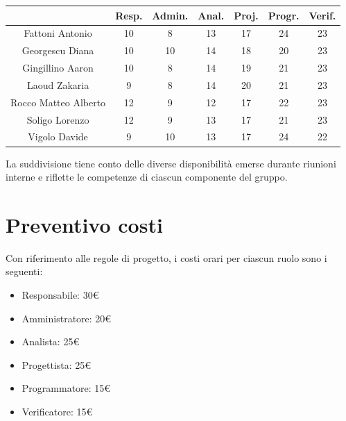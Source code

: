 \documentclass[a4paper,12pt]{article}
\begin{document}
\vspace{1cm}
\begin{table}[H]
{
\centering
\begin{tabular}{c|c|c|c|c|c|c}

        & \textbf{Resp.} & \textbf{Admin.} & \textbf{Anal.} & \textbf{Proj.} & \textbf{Progr.} & \textbf{Verif.} \\
        \hline
        Fattoni Antonio & 10 & 8 & 13 & 17 & 24 & 23\\
        \hline
        Georgescu Diana & 10 & 10 & 14 & 18 & 20 & 23\\
        \hline
        Gingillino Aaron & 10 & 8 & 14 & 19 & 21 & 23\\
        \hline
        Laoud Zakaria & 9 & 8 & 14 & 20 & 21 & 23\\
        \hline
        Rocco Matteo Alberto & 12 & 9 & 12 & 17 & 22 & 23\\
        \hline
        Soligo Lorenzo & 12 & 9 & 13 & 17 & 21 & 23\\
        \hline
        Vigolo Davide & 9 & 10 & 13 & 17 & 24 & 22\\
\end{tabular}\par
}
\end{table}

\noindent La suddivisione tiene conto delle diverse disponibilità emerse durante riunioni interne e riflette le competenze di ciascun componente del gruppo.

\section{Preventivo costi}
Con riferimento alle regole di progetto, i costi orari per ciascun ruolo sono i seguenti:
\begin{itemize} [noitemsep]
    \item Responsabile: 30€
    \item Amministratore: 20€
    \item Analista: 25€
    \item Progettista: 25€
    \item Programmatore: 15€
    \item Verificatore: 15€
\end{itemize}
\end{document}
